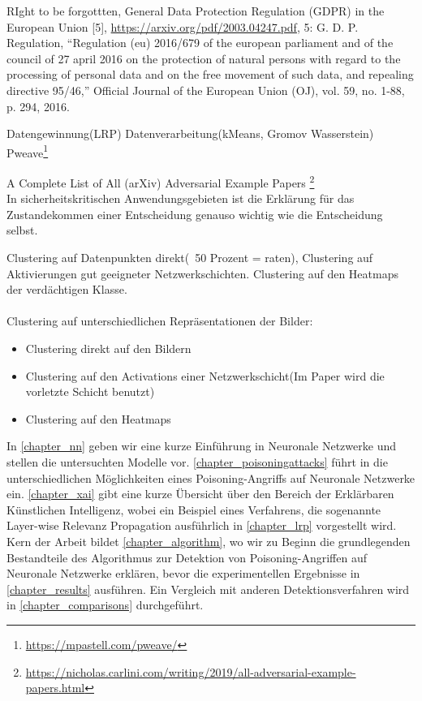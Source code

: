 \documentclass[11pt,a4paper]{article}
\numberwithin{equation}{section}
\begin{document}
	
	
	
	RIght to be forgottten,  General Data Protection Regulation (GDPR) in
	the European Union [5], \url{https://arxiv.org/pdf/2003.04247.pdf}, 5: G. D. P. Regulation, “Regulation (eu) 2016/679 of the
	european parliament and of the council of 27 april 2016
	on the protection of natural persons with regard to the
	processing of personal data and on the free movement
	of such data, and repealing directive 95/46,” Official
	Journal of the European Union (OJ), vol. 59, no. 1-88,
	p. 294, 2016.
	
	Datengewinnung(LRP)
	Datenverarbeitung(kMeans, Gromov Wasserstein)
	Pweave\footnote{\url{https://mpastell.com/pweave/}}
	
	A Complete List of All (arXiv) Adversarial Example Papers \footnote{\url{https://nicholas.carlini.com/writing/2019/all-adversarial-example-papers.html}}
	\\
	In sicherheitskritischen Anwendungsgebieten ist die Erklärung für das Zustandekommen einer Entscheidung genauso wichtig wie die Entscheidung selbst\cite{LRP_DNN}.
	
	Clustering auf Datenpunkten direkt(~50 Prozent = raten), Clustering auf Aktivierungen gut geeigneter Netzwerkschichten. Clustering auf den Heatmaps der verdächtigen Klasse.\\
	\\
	
	Clustering auf unterschiedlichen Repräsentationen der Bilder:
	\begin{itemize}
		\item Clustering direkt auf den Bildern\\
		\item Clustering auf den Activations einer Netzwerkschicht(Im Paper \cite{AC} wird die vorletzte Schicht benutzt)
		\item Clustering auf den Heatmaps
	\end{itemize}
	In \autoref{chapter_nn} geben wir eine kurze Einführung in Neuronale Netzwerke und stellen die untersuchten Modelle vor. \autoref{chapter_poisoningattacks} führt in die unterschiedlichen Möglichkeiten eines Poisoning-Angriffs auf Neuronale Netzwerke ein. \autoref{chapter_xai} gibt eine kurze Übersicht über den Bereich der Erklärbaren Künstlichen Intelligenz, wobei ein Beispiel eines Verfahrens, die sogenannte Layer-wise Relevanz Propagation ausführlich in \autoref{chapter_lrp} vorgestellt wird. Kern der Arbeit bildet \autoref{chapter_algorithm}, wo wir zu Beginn die grundlegenden Bestandteile des Algorithmus zur Detektion von Poisoning-Angriffen auf Neuronale Netzwerke erklären, bevor die experimentellen Ergebnisse in \autoref{chapter_results} ausführen. Ein Vergleich mit anderen Detektionsverfahren wird in \autoref{chapter_comparisons} durchgeführt.
\end{document}
